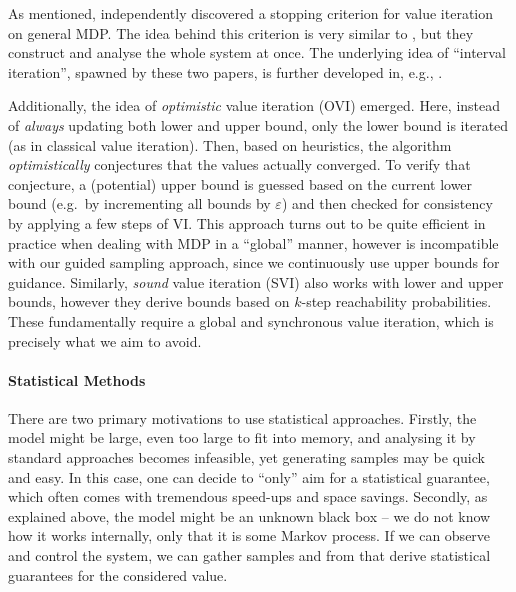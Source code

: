 \documentclass{article}
\begin{document}
As mentioned, \cite{DBLP:conf/rp/HaddadM14} independently discovered a stopping criterion for value iteration on general MDP.
The idea behind this criterion is very similar to \cite{DBLP:conf/atva/BrazdilCCFKKPU14}, but they construct and analyse the whole system at once.
The underlying idea of \enquote{interval iteration}, spawned by these two papers, is further developed in, e.g., \cite{DBLP:conf/cav/Baier0L0W17,DBLP:journals/tcs/HaddadM18,DBLP:conf/lics/AshokCKWW20}.

Additionally, the idea of \emph{optimistic} value iteration (OVI) \cite{DBLP:conf/cav/HartmannsK20,DBLP:conf/atva/AzeemEKSW22} emerged.
Here, instead of \emph{always} updating both lower and upper bound, only the lower bound is iterated (as in classical value iteration).
Then, based on heuristics, the algorithm \emph{optimistically} conjectures that the values actually converged.
To verify that conjecture, a (potential) upper bound is guessed based on the current lower bound (e.g.\ by incrementing all bounds by $\varepsilon$) and then checked for consistency by applying a few steps of VI.
This approach turns out to be quite efficient in practice when dealing with MDP in a \enquote{global} manner, however is incompatible with our guided sampling approach, since we continuously use upper bounds for guidance.
Similarly, \emph{sound} value iteration (SVI) \cite{DBLP:conf/cav/QuatmannK18} also works with lower and upper bounds, however they derive bounds based on $k$-step reachability probabilities.
These fundamentally require a global and synchronous value iteration, which is precisely what we aim to avoid.


\paragraph{Statistical Methods}
There are two primary motivations to use statistical approaches.
Firstly, the model might be large, even too large to fit into memory, and analysing it by standard approaches becomes infeasible, yet generating samples may be quick and easy.
In this case, one can decide to \enquote{only} aim for a statistical guarantee, which often comes with tremendous speed-ups and space savings.
Secondly, as explained above, the model might be an unknown black box -- we do not know how it works internally, only that it is some Markov process.
If we can observe and control the system, we can gather samples and from that derive statistical guarantees for the considered value.
\end{document}

